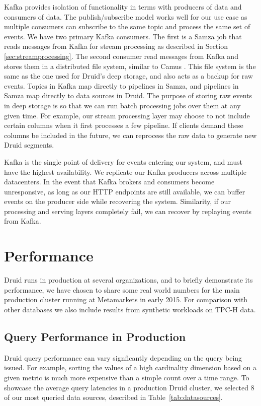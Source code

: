 \documentclass{vldb}
\begin{document}
Kafka provides isolation of functionality in terms with producers of data and
consumers of data. The publish/subscribe model works well for our use case as
multiple consumers can subscribe to the same topic and process the same set of
events. We have two primary Kafka consumers. The first is a Samza job that
reads messages from Kafka for stream processing as described in Section
\ref{sec:streamprocessing}. The second consumer read messages from Kafka and
stores them in a distributed file system, similar to Camus \cite{2013linkedin}.
This file system is the same as the one used for Druid’s deep storage, and also
acts as a backup for raw events. Topics in Kafka map directly to pipelines in
Samza, and pipelines in Samza map directly to data sources in Druid. The
purpose of storing raw events in deep storage is so that we can run batch
processing jobs over them at any given time. For example, our stream processing
layer may choose to not include certain columns when it first processes a few
pipeline.  If clients demand these columns be included in the future, we can
reprocess the raw data to generate new Druid segments. 

Kafka is the single point of delivery for events entering our system, and must
have the highest availability. We replicate our Kafka producers across multiple
datacenters. In the event that Kafka brokers and consumers become unresponsive,
as long as our HTTP endpoints are still available, we can buffer events on the
producer side while recovering the system. Similarity, if our processing and
serving layers completely fail, we can recover by replaying events from Kafka.

\section{Performance}
\label{sec:performance}
Druid runs in production at several organizations, and to briefly demonstrate
its performance, we have chosen to share some real world numbers for the main
production cluster running at Metamarkets in early 2015. For comparison with
other databases we also include results from synthetic workloads on TPC-H data.

\subsection{Query Performance in Production}
Druid query performance can vary signficantly depending on the query being
issued. For example, sorting the values of a high cardinality dimension based
on a given metric is much more expensive than a simple count over a time range.
To showcase the average query latencies in a production Druid cluster, we
selected 8 of our most queried data sources, described in
Table~\ref{tab:datasources}.
\end{document}
